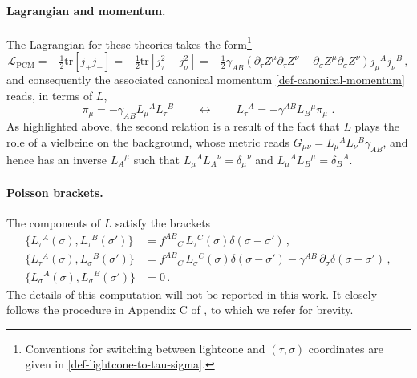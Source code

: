 \documentclass[12pt]{article}
\numberwithin{equation}{section}
\begin{document}
\paragraph{Lagrangian and momentum.} The Lagrangian for these theories takes the form\footnote{Conventions for switching between lightcone and $(\tau,\sigma)$ coordinates are given in \eqref{def-lightcone-to-tau-sigma}.}
\begin{equation}
\mathcal{L}_{\textrm{PCM}}=-\tfrac{1}{2}\mathrm{tr}[j_{+}j_{-}]=-\tfrac{1}{2}\mathrm{tr}[j_{\tau}^2-j_{\sigma}^2]=-\tfrac{1}{2}\gamma_{AB}(\partial_{\tau}Z^{\mu}\partial_{\tau}Z^{\nu}-\partial_{\sigma}Z^{\mu}\partial_{\sigma}Z^{\nu})j_{\mu}{}^{A}j_{\nu}{}^{B} \, ,
\end{equation}
and consequently the associated canonical momentum \eqref{def-canonical-momentum} reads, in terms of $L$,
\begin{equation}\label{PCM-momentum-rel}
\pi_{\mu}=-\gamma_{AB}L_{\mu}{}^{A}L_{\tau}{}^{B}
\qquad \longleftrightarrow \qquad
L_{\tau}{}^{A}=-\gamma^{AB}L_{B}{}^{\mu}\pi_{\mu} \,\, .
\end{equation}
As highlighted above, the second relation is a result of the fact that $L$ plays the role of a vielbeine on the background, whose metric reads $G_{\mu\nu}=L_{\mu}{}^{A}L_{\nu}{}^{B}\gamma_{AB}$, and hence has an inverse $L_{A}{}^{\mu}$ such that $L_{\mu}{}^{A}L_{A}{}^{\nu}=\delta_{\mu}{}^{\nu}$ and $L_{\mu}{}^{A}L_{B}{}^{\mu}=\delta_{B}{}^{A}$.


\paragraph{Poisson brackets.} The components of $L$ satisfy the brackets
\begin{equation}\label{PCM-brackets-summary}
\begin{aligned}
\{ L_{\tau}{}^{A}(\sigma),L_{\tau}{}^{B}(\sigma') \} &= f^{AB}{}_{C} \, L_{\tau}{}^{C}(\sigma)\delta(\sigma-\sigma') \, ,
\\
\{ L_{\tau}{}^{A}(\sigma),L_{\sigma}{}^{B}(\sigma') \} &= f^{AB}{}_{C} \, L_{\sigma}{}^{C}(\sigma)\delta(\sigma-\sigma')-\gamma^{AB} \, \partial_{\sigma}\delta(\sigma-\sigma') \, ,
\\
\{ L_{\sigma}{}^{A}(\sigma),L_{\sigma}{}^{B}(\sigma') \} &= 0 \, .
\end{aligned}
\end{equation}
The details of this computation will not be reported in this work. It closely follows the procedure in Appendix C of \cite{Bielli:2024ach}, to which we refer for brevity.
\end{document}

